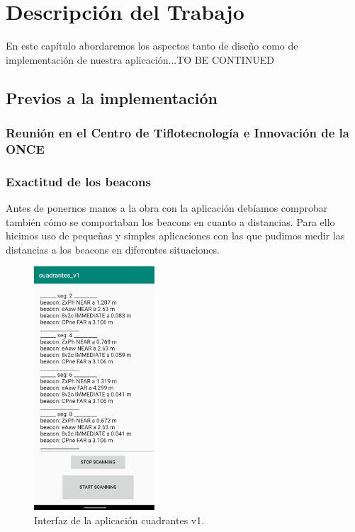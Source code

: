 \chapter{Descripción del Trabajo}
\label{cap:descripcionTrabajo}

En este capítulo abordaremos los aspectos tanto de diseño como de implementación de nuestra aplicación...TO BE CONTINUED

\section{Previos a la implementación}

\subsection{Reunión en el Centro de Tiflotecnología e Innovación de la ONCE}

\subsection{Exactitud de los beacons}

Antes de ponernos manos a la obra con la aplicación debíamos comprobar también cómo se comportaban los beacons en cuanto a distancias. Para ello hicimos uso de pequeñas y simples aplicaciones con las que pudimos medir las distancias a los beacons en diferentes situaciones. 

\begin{figure}[t]
	\centering
	\includegraphics[width=0.4\textwidth]{Imagenes/Descripciondeltrabajo/cuadrantes_v1}
	\caption{Interfaz de la aplicación cuadrantes v1.}
	\label{fig:cuadrantesv1}
\end{figure}


